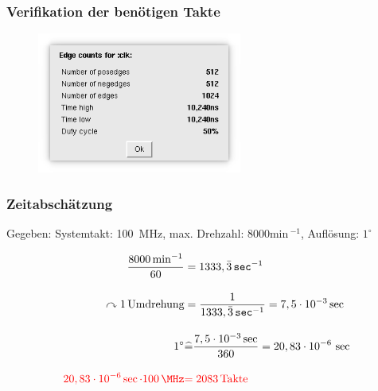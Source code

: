 \begin{frame}\frametitle{Verifikation der benötigen Takte}
 \begin{figure}[htbp]
  \centering
  \includegraphics[width=0.6\textwidth]{img/Simulation_edge_count_clk.png}
 \end{figure}

\end{frame}



\begin{frame}\frametitle{Zeitabschätzung}
\vspace{-0.5cm}
\begin{center}
Gegeben: Systemtakt: \SI{100}{MHz}, max. Drehzahl: 8000min\,${}^{-1}$, Auflösung: $1^\circ$ 
\end{center}
\vspace{0.3cm}

 \begin{align*}
    \frac{8000\min^{-1}}{60} &= 1333,\bar{3}\,\texttt{sec}^{-1}  \\[10pt]
    \nonumber \curvearrowright 1\, \textrm{Umdrehung} &= \frac{1}{1333,\bar{3}\,\texttt{sec}^{-1}} = 7,5\cdot 10^{-3}\,\textrm{sec}\\[10pt]
    \nonumber 1^\circ &\widehat{=} \frac{7,5\cdot 10^{-3}\,\textrm{sec}}{360} = 20,83\cdot10^{-6}\,\sec \\[10pt]
    \textcolor{red}{20,83\cdot10^{-6}\sec \cdot 100\,\MHz} & \textcolor{red}{ = 2083\, \textrm{Takte}}
\end{align*}
\end{frame}


